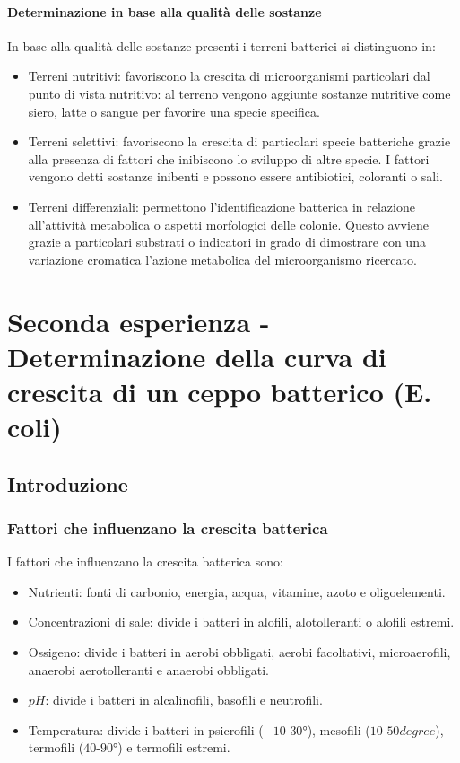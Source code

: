 			\paragraph{Determinazione in base alla qualit\`a delle sostanze}
			In base alla qualit\`a delle sostanze presenti i terreni batterici si distinguono in:
			\begin{itemize}
				\item Terreni nutritivi: favoriscono la crescita di microorganismi particolari dal punto di vista nutritivo:
					al terreno vengono aggiunte sostanze nutritive come siero, latte o sangue per favorire una specie specifica.
				\item Terreni selettivi: favoriscono la crescita di particolari specie batteriche grazie alla presenza di fattori che inibiscono lo sviluppo di altre specie.
					I fattori vengono detti sostanze inibenti e possono essere antibiotici, coloranti o sali.
				\item Terreni differenziali: permettono l'identificazione batterica in relazione all'attivit\`a metabolica o aspetti morfologici delle colonie.
					Questo avviene grazie a particolari substrati o indicatori in grado di dimostrare con una variazione cromatica l'azione metabolica del microorganismo ricercato.
			\end{itemize}

\section{Seconda esperienza - Determinazione della curva di crescita di un ceppo batterico (E. coli)}
	
	\subsection{Introduzione}

		\subsubsection{Fattori che influenzano la crescita batterica}
		I fattori che influenzano la crescita batterica sono:
		\begin{multicols}{2}
			\begin{itemize}
				\item Nutrienti: fonti di carbonio, energia, acqua, vitamine, azoto e oligoelementi.
				\item Concentrazioni di sale: divide i batteri in alofili, alotolleranti o alofili estremi.
				\item Ossigeno: divide i batteri in aerobi obbligati, aerobi facoltativi, microaerofili, anaerobi aerotolleranti e anaerobi obbligati.
				\item $pH$: divide i batteri in alcalinofili, basofili e neutrofili.
				\item Temperatura: divide i batteri in psicrofili ($-10$-$30\si{\degree}$), mesofili ($10$-$50\si{degree}$), termofili ($40$-$90\si{\degree}$) e termofili estremi.
			\end{itemize}
		\end{multicols}

